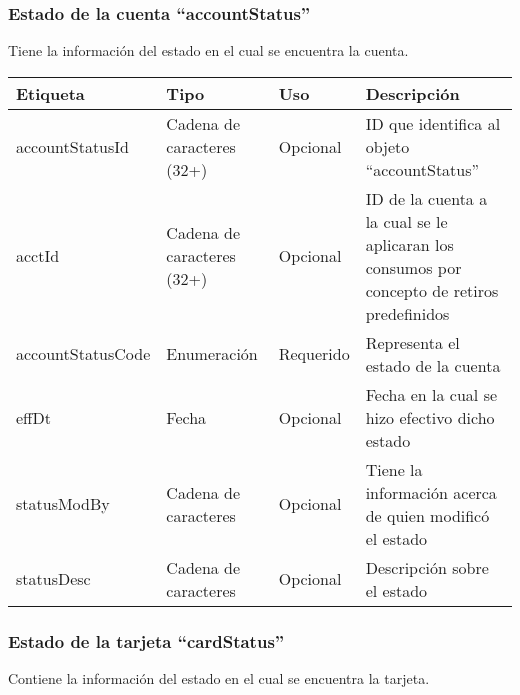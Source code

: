 \subsubsection{Estado de la cuenta ``accountStatus''}
Tiene la información del estado en el cual se encuentra la cuenta.

\begin{center}
\begin{longtable}{|>{\centering\arraybackslash}p{}|>{\centering\arraybackslash}p{}|>{\centering\arraybackslash}p{}|>{\centering\arraybackslash}p{}|}
\hline 
\bfseries {Etiqueta} & \bfseries {Tipo} & \bfseries {Uso} & \bfseries {Descripción} \\ 
\hline 
accountStatusId & Cadena de caracteres (32+) & Opcional & ID que identifica al objeto ``accountStatus'' \\ 
\hline
acctId & Cadena de caracteres (32+) & Opcional & ID de la cuenta a la cual se le aplicaran los consumos por concepto de retiros predefinidos \\ 
\hline 
accountStatusCode & Enumeración & Requerido & Representa el estado de la cuenta \\
\hline 
effDt & Fecha & Opcional & Fecha en la cual se hizo efectivo dicho estado \\
\hline 
statusModBy & Cadena de caracteres & Opcional & Tiene la información acerca de quien modificó el estado \\
\hline 
statusDesc & Cadena de caracteres & Opcional & Descripción sobre el estado \\
\hline 
\end{longtable}
\end{center}

\subsubsection{Estado de la tarjeta ``cardStatus''}
Contiene la información del estado en el cual se encuentra la tarjeta.

